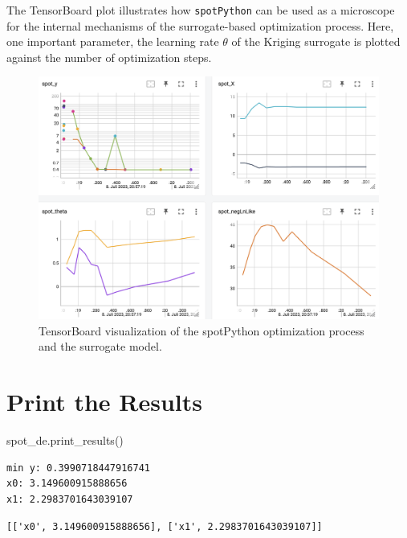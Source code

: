 \documentclass[
  letterpaper,
  DIV=11,
  numbers=noendperiod]{scrreprt}
\newenvironment{Shaded}{\begin{snugshade}}{\end{snugshade}}
\newcommand{\NormalTok}[1]{\textcolor[rgb]{0.00,0.23,0.31}{#1}}
\begin{document}
The TensorBoard plot illustrates how \texttt{spotPython} can be used as
a microscope for the internal mechanisms of the surrogate-based
optimization process. Here, one important parameter, the learning rate
\(\theta\) of the Kriging surrogate is plotted against the number of
optimization steps.

\begin{figure}[H]

{\centering \includegraphics[width=1\textwidth,height=\textheight]{figures_static/05_tensorboard_01.png}

}

\caption{TensorBoard visualization of the spotPython optimization
process and the surrogate model.}

\end{figure}%

\section{Print the Results}\label{print-the-results}

\begin{Shaded}
\begin{Highlighting}[]
\NormalTok{spot\_de.print\_results()}
\end{Highlighting}
\end{Shaded}

\begin{verbatim}
min y: 0.3990718447916741
x0: 3.149600915888656
x1: 2.2983701643039107
\end{verbatim}

\begin{verbatim}
[['x0', 3.149600915888656], ['x1', 2.2983701643039107]]
\end{verbatim}
\end{document}
